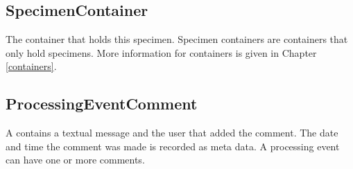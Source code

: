 \subsection*{SpecimenContainer}
The container that holds this specimen. Specimen containers are containers that
only hold specimens. More information for containers is given in Chapter
\ref{containers}.

\subsection*{ProcessingEventComment}
A  contains a textual message and the
user that added the comment. The date and time the comment was made is recorded
as meta data. A processing event can have one or more comments.

